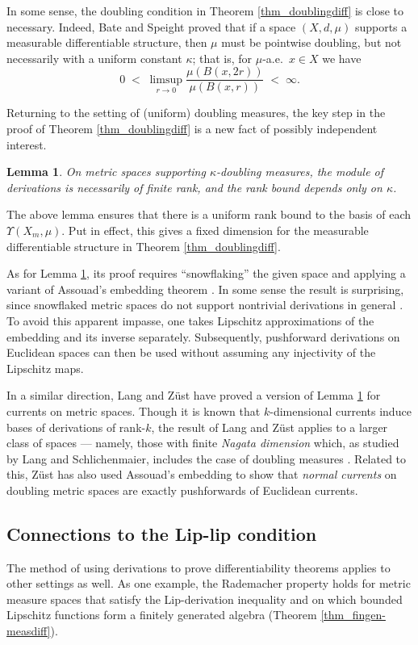 \documentclass[reqno]{amsart}
\theoremstyle{plain}
\newtheorem{lemma}[thm]{Lemma}
\theoremstyle{definition}
\theoremstyle{remark}
\numberwithin{equation}{section}
\newcommand{\U}{\Upsilon}
\begin{document}
In some sense, the doubling condition in Theorem \ref{thm_doublingdiff} is close to necessary.  Indeed, Bate and Speight \cite{Bate:Speight} proved that if a space $(X,d,\mu)$ supports a measurable differentiable structure, then $\mu$ must be pointwise doubling, but not necessarily with a uniform constant $\kappa$; that is, for $\mu$-a.e.\ $x \in X$ we have
$$
0 \;<\;
\limsup_{r \to 0} \frac{\mu(B(x,2r))}{\mu(B(x,r))} \;<\;
\infty.
$$

Returning to the setting of (uniform) doubling measures, the key step in the proof of Theorem \ref{thm_doublingdiff} is a new fact of possibly independent interest.

\begin{lemma} \label{lemma_doublingbd} 
On metric spaces supporting $\kappa$-doubling measures, the module of derivations is necessarily of finite rank, and the rank bound depends only on $\kappa$.
\end{lemma}

The above lemma ensures that there is a uniform rank bound to the basis of each $\U(X_m,\mu)$.  Put in effect, 
this gives a fixed dimension for the measurable differentiable structure in Theorem \ref{thm_doublingdiff}.

As for Lemma \ref{lemma_doublingbd}, its proof requires ``snowflaking'' the given space and applying a variant of Assouad's embedding theorem \cite{Assouad}.  In some sense the result is surprising, since snowflaked metric spaces do not support nontrivial derivations in general \cite[Thm 36]{WeaverED}.  To avoid this apparent impasse, one takes Lipschitz approximations of the embedding and its inverse separately.  Subsequently, pushforward derivations on Euclidean spaces can then be used without assuming any injectivity of the Lipschitz maps.

In a similar direction, Lang and Z\"ust \cite{Lang:Zuest} have proved a version of Lemma \ref{lemma_doublingbd} for currents on metric spaces.  Though it is known \cite{Gong_currents} that $k$-dimensional currents induce bases of derivations of rank-$k$, the result of Lang and Z\"ust applies to a larger class of spaces --- namely, those with finite {\em Nagata dimension} which, as studied by Lang and Schlichenmaier, includes the case of doubling measures \cite{Lang:Schlichenmaier}.  Related to this, Z\"ust \cite{Zust} has also used Assouad's embedding to show that {\em normal currents} on doubling metric spaces are exactly pushforwards of Euclidean currents.


\subsection{Connections to the Lip-lip condition}
The method of using derivations to prove differentiability theorems applies to other settings as well. As one example, the Rademacher property holds for metric measure spaces that satisfy the Lip-derivation inequality and on which bounded Lipschitz functions form a finitely generated algebra (Theorem \ref{thm_fingen-measdiff}).
\end{document}
